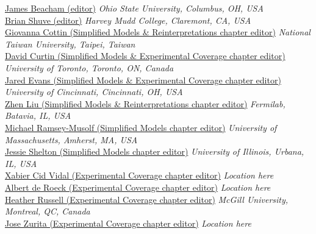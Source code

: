 \noindent\href{mailto:j.beacham@cern.ch}{James Beacham (editor)} 
\emph{Ohio State University, Columbus, OH, USA}\\

\noindent\href{mailto:bshuve@g.hmc.edu}{Brian Shuve (editor)} 
\emph{Harvey Mudd College, Claremont, CA, USA}\\



\noindent\href{mailto:gcottin@phys.ntu.edu.tw}{Giovanna Cottin (Simplified Models \& Reinterpretations chapter editor)} 
\emph{National Taiwan University, Taipei, Taiwan}\\

\noindent\href{mailto:david.r.curtin@gmail.com}{David Curtin (Simplified Models \& Experimental Coverage chapter editor)} 
\emph{University of Toronto, Toronto, ON, Canada}\\

\noindent\href{mailto:jaevans@ucdavis.edu}{Jared Evans (Simplified Models \& Experimental Coverage chapter editor)} 
\emph{University of Cincinnati, Cincinnati, OH, USA}\\

\noindent\href{mailto:zliu2@fnal.gov}{Zhen Liu (Simplified Models \& Reinterpretations chapter editor)} 
\emph{Fermilab, Batavia, IL, USA}\\

\noindent\href{mailto:mjrm@physics.umass.edu}{Michael Ramsey-Musolf (Simplified Models chapter editor)} 
\emph{University of Massachusetts, Amherst, MA, USA}\\

\noindent\href{mailto:jshelton137@gmail.com}{Jessie Shelton (Simplified Models chapter editor)} 
\emph{University of Illinois, Urbana, IL, USA}\\

\noindent\href{mailto:xabier.cid.vidal@cern.ch}{Xabier Cid Vidal (Experimental Coverage chapter editor)} 
\emph{Location here}\\

\noindent\href{mailto:Albert.de.Roeck@cern.ch}{Albert de Roeck (Experimental Coverage chapter editor)} 
\emph{Location here}\\

\noindent\href{mailto:heather.russell@cern.ch}{Heather Russell (Experimental Coverage chapter editor)} 
\emph{McGill University, Montreal, QC, Canada}\\

\noindent\href{mailto:jose.zurita@kit.edu}{Jose Zurita (Experimental Coverage chapter editor)} 
\emph{Location here}\\


